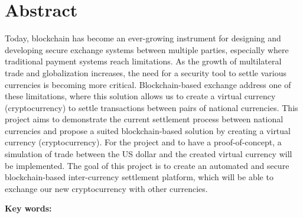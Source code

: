 \chapter*{Abstract}
\label{ch:abstract}
Today, blockchain has become an ever-growing instrument for designing and developing secure exchange systems between multiple parties, especially where
traditional payment systems reach limitations. As the growth of multilateral trade and globalization increases, the need for a security tool to settle various
currencies is becoming more critical. Blockchain-based exchange address one of these limitations, where this solution allows us to create a virtual currency (cryptocurrency)
to settle transactions between pairs of national currencies. This project aims to demonstrate the current settlement process between national currencies and
propose a suited blockchain-based solution by creating a virtual currency (cryptocurrency). For the project and to have a proof-of-concept,
a simulation of trade between the US dollar and the created virtual currency will be implemented. The goal of this project is to create an automated and secure blockchain-based
inter-currency settlement platform, which will be able to exchange our new cryptocurrency with other currencies.

\vskip0.5cm
\textbf{Key words:} 
\Keywords

